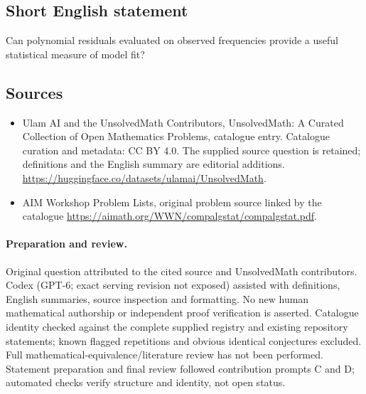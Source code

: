 \documentclass[11pt]{article}
\begin{document}
\subsection{Short English statement}
Can polynomial residuals evaluated on observed frequencies provide a useful statistical measure of model fit?
\subsection{Sources}
\begin{itemize}
\item[\hypertarget{source:statement:1}{S1}] Ulam AI and the UnsolvedMath Contributors, UnsolvedMath: A Curated Collection of Open Mathematics Problems, catalogue entry. Catalogue curation and metadata: CC BY 4.0. The supplied source question is retained; definitions and the English summary are editorial additions.
\url{https://huggingface.co/datasets/ulamai/UnsolvedMath}.
\item[\hypertarget{source:statement:2}{S2}] AIM Workshop Problem Lists, original problem source linked by the catalogue
\url{https://aimath.org/WWN/compalgstat/compalgstat.pdf}.
\end{itemize}
\paragraph{Preparation and review.}
Original question attributed to the cited source and UnsolvedMath contributors. Codex (GPT-6; exact serving revision not exposed) assisted with definitions, English summaries, source inspection and formatting. No new human mathematical authorship or independent proof verification is asserted. Catalogue identity checked against the complete supplied registry and existing repository statements; known flagged repetitions and obvious identical conjectures excluded. Full mathematical-equivalence/literature review has not been performed. Statement preparation and final review followed contribution prompts C and D; automated checks verify structure and identity, not open status.
\label{end:statement}
\end{document}
